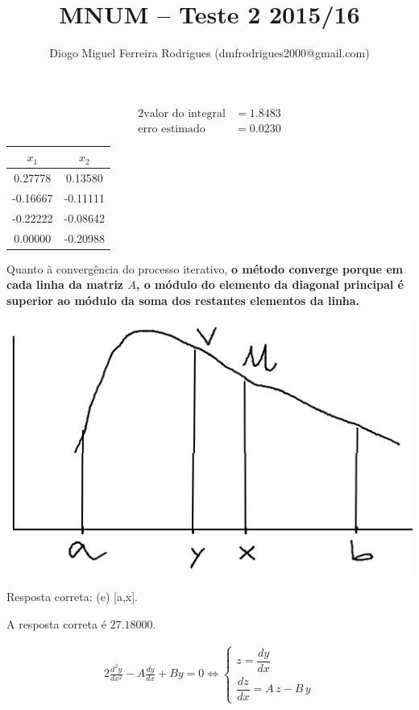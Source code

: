 \documentclass{mnum}
\title{MNUM -- Teste 2 2015/16}
\author{Diogo Miguel Ferreira Rodrigues (dmfrodrigues2000@gmail.com)}
\begin{document}
\setcounter{chapter}{14}


\begin{alignat*}{2}
	\text{valor do integral} &= 1.8483\\
	\text{erro estimado}     &= 0.0230
\end{alignat*}


\begin{center} \begin{tabular}{c | c}
	$x_1   $ & $x_2$ \\ \hline
	 0.27778 &  0.13580 \\
	-0.16667 & -0.11111 \\
	-0.22222 & -0.08642 \\
	 0.00000 & -0.20988
\end{tabular} \end{center}
Quanto à convergência do processo iterativo, \textbf{o método converge porque em cada linha da matriz $A$, o módulo do elemento da diagonal principal é superior ao módulo da soma dos restantes elementos da linha.}

\begin{center} \includegraphics[scale=0.5]{2015T2_3} \end{center}
Resposta correta: (e) [a,x].

A resposta correta é $27.18000$.

\begin{alignat*}{2}
	\frac{d^2y}{dx^2}-A\frac{dy}{dx}+By=0 \iff
	\begin{cases}
		z = \dfrac{dy}{dx}\\
		\dfrac{dz}{dx}=A\,z-B\,y
	\end{cases}
\end{alignat*}

\end{document}
